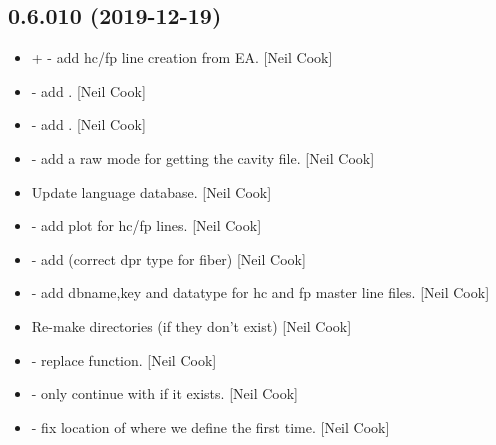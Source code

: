 \documentclass[a4paper,10pt,english]{report}
\begin{document}
\subsection{0.6.010 (2019-12-19)}
\label{\detokenize{misc/changelog:id9}}\begin{itemize}
\item {} 
 +  - add
hc/fp line creation from EA. {[}Neil Cook{]}

\item {} 
 - add .
{[}Neil Cook{]}

\item {} 
 - add . {[}Neil Cook{]}

\item {} 
 - add a raw mode for getting the cavity file. {[}Neil
Cook{]}

\item {} 
Update language database. {[}Neil Cook{]}

\item {} 
 - add plot  for hc/fp
lines. {[}Neil Cook{]}

\item {} 
 - add  (correct dpr
type for fiber) {[}Neil Cook{]}

\item {} 
 - add dbname,key and
datatype for hc and fp master line files. {[}Neil Cook{]}

\item {} 
Re-make directories (if they don’t exist) {[}Neil Cook{]}

\item {} 
 - replace  function. {[}Neil Cook{]}

\item {} 
 - only continue with  if it
exists. {[}Neil Cook{]}

\item {} 
 - fix location of where we define
 the first time. {[}Neil Cook{]}


\end{itemize}
\end{document}
